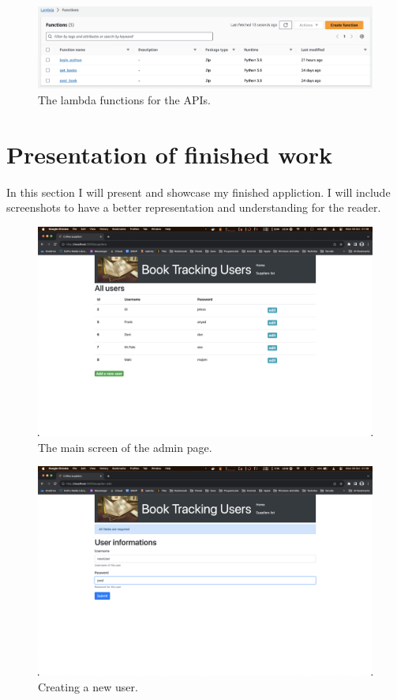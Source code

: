 \documentclass[11pt,a4paper,oneside]{report}
\begin{document}
\begin{figure}[!ht]
  \centering
  \includegraphics[scale=0.4]{lambda_functions.png}
  \caption{The lambda functions for the APIs.}
  \label{fig:TexnicCenter}
\end{figure}


\chapter{Presentation of finished work}

In this section I will present and showcase my finished appliction. I will include screenshots to have a better representation and understanding for the reader.


\begin{figure}[!ht]
  \centering
  \includegraphics[scale=0.3]{admin_list.png}
  \caption{The main screen of the admin page.}
  \label{fig:TexnicCenter}
\end{figure}

\begin{figure}[!ht]
  \centering
  \includegraphics[scale=0.3]{admin_create.png}
  \caption{Creating a new user.}
  \label{fig:TexnicCenter}
\end{figure}
\end{document}
